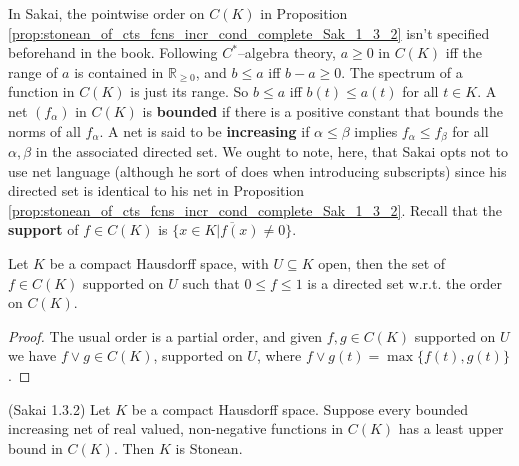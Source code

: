 In Sakai, the pointwise order on $C(K)$ in Proposition \ref{prop:stonean_of_cts_fcns_incr_cond_complete_Sak_1_3_2}
isn't specified beforehand in the book. Following $C^{*}$--algebra theory, $a\ge 0$ in $C(K)$
iff the range of $a$ is contained in $\mathbb{R}_{\ge 0}$, and $b\le a$ iff $b-a \ge 0$. The spectrum
of a function in $C(K)$ is just its range. So $b\le a$ iff $b(t)\le a(t)$ for all $t\in K$. A net
 $(f_{\alpha})$ in $C(K)$ is \textbf{bounded} if there is a positive constant that bounds the norms of all $f_{\alpha}$.
A net is said to be \textbf{increasing} if $\alpha \le \beta$ implies $f_{\alpha}\le f_{\beta}$ for all $\alpha,\beta$
in the associated directed set. We ought to note, here, that Sakai opts not to use net language
(although he sort of does when introducing subscripts) since his directed set is identical to his net
in Proposition \ref{prop:stonean_of_cts_fcns_incr_cond_complete_Sak_1_3_2}. Recall that
the \textbf{support} of $f\in C(K)$ is $\overline{\{x\in K | f(x)\ne 0\}}$.

\begin{lemma}
    \label{lem:cts_fns_ge_zero_le_one_directed}
    Let $K$ be a compact Hausdorff space, with $U\subseteq K$ open, then the set of $f\in C(K)$ supported on $U$ such that
    $0 \le f \le 1$ is a directed set w.r.t. the order on $C(K)$.
\end{lemma}

\begin{proof}
    The usual order is a partial order, and given $f,g\in C(K)$ supported on $U$ we have $f\vee g \in C(K)$,
    supported on $U$, where $f\vee g(t)=\max\{f(t),g(t)\}$.
\end{proof}

\begin{proposition}
    \label{prop:stonean_of_cts_fcns_incr_cond_complete_Sak_1_3_2} (Sakai 1.3.2)
    Let $K$ be a compact Hausdorff space. Suppose every bounded increasing net
    of real valued, non-negative functions in $C(K)$ has a least upper bound in $C(K)$.
    Then $K$ is Stonean.
\end{proposition}

